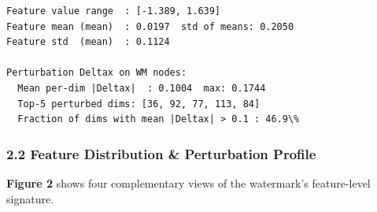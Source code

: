 \documentclass[11pt]{article}
\begin{document}
    \begin{Verbatim}[commandchars=\\\{\}]
Feature value range  : [-1.389, 1.639]
Feature mean (mean)  : 0.0197  std of means: 0.2050
Feature std  (mean)  : 0.1124

Perturbation Deltax on WM nodes:
  Mean per-dim |Deltax|  : 0.1004  max: 0.1744
  Top-5 perturbed dims: [36, 92, 77, 113, 84]
  Fraction of dims with mean |Deltax| > 0.1 : 46.9\%
    \end{Verbatim}

    \subsubsection{2.2 Feature Distribution \& Perturbation
Profile}\label{feature-distribution-perturbation-profile}

\textbf{Figure 2} shows four complementary views of the watermark's
feature-level signature.
\end{document}
